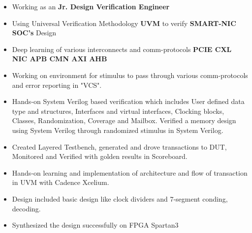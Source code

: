 \documentclass[10pt,a4paper]{altacv}
\begin{document}

\personalinfo
{
}

\begin{fullwidth}
\makecvheader
\end{fullwidth}


\begin{itemize}
\item Working as an \textbf{Jr. Design Verification Engineer}
\item Using Universal Verification Methodology \textbf{UVM} to verify \textbf{SMART-NIC SOC's} Design
\item Deep learning of various interconnects and comm-protocols \textbf{PCIE CXL NIC APB CMN AXI AHB}
\item Working on environment for stimulus to pass through various comm-protocols and error reporting in "VCS". 
\end{itemize}
\divider
\medskip

\begin{itemize}
\item Hands-on System Verilog based veriﬁcation which includes User deﬁned data type and structures, Interfaces and virtual interfaces, Clocking blocks, Classes, Randomization, Coverage and Mailbox. Veriﬁed a memory design using System Verilog through randomized stimulus in System
Verilog.
\item Created Layered Testbench, generated and drove transactions to DUT, Monitored and Veriﬁed with golden results in Scoreboard.
\item Hands-on learning and implementation of architecture and ﬂow of transaction in UVM with Cadence Xcelium.
\end{itemize}

\begin{itemize}
\item Design included basic design like clock dividers and 7-segment conding, decoding.
\item Synthesized the design successfully on FPGA Spartan3
\end{itemize}
\divider
\end{document}
